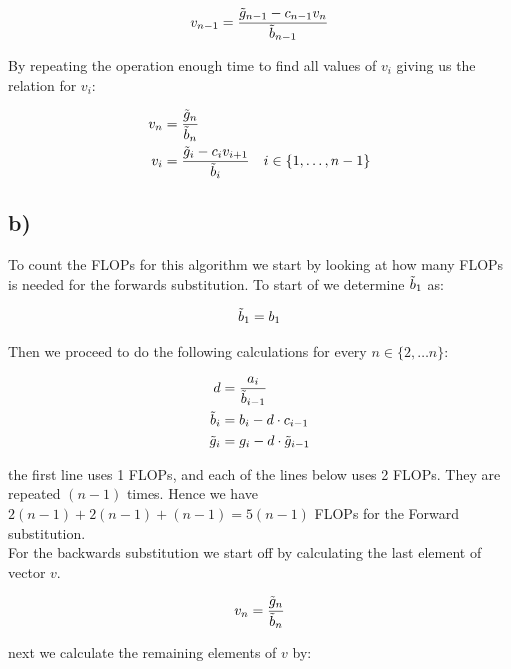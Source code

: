 \documentclass[a4paper,10pt,english]{article}
\begin{document}
			\begin{equation*}
				v_{n-1} = \frac{\Tilde{g}_{n-1}-c_{n-1}v_n}{\Tilde{b}_{n-1}}
			\end{equation*}
			
			By repeating the operation enough time to find all values of $v_i$ giving us the
			relation for $v_i$:
			
			\begin{align*}
				v_n &= \frac{\Tilde{g}_n}{\Tilde{b}_n} \\
				v_i &= \frac{\Tilde{g}_i - c_i v_{i+1}}{\Tilde{b}_i} \quad i \in \{1, \dots, n-1\} 
			\end{align*}
			
			
			\subsection{b)}
			To count the FLOPs for this algorithm we start by looking at how many FLOPs is
			needed for the forwards substitution.
			To start of we determine $\Tilde{b}_1$ as:
			
			\begin{equation}
				\Tilde{b}_1 = b_1
				\label{eq_gen_algo_I}
			\end{equation}
			
			Then we proceed to do the following calculations for every $n \in \{2,\dots n\}$:
			
			\begin{align}
				d &= \frac{a_i}{\Tilde{b}_{i-1}} \\
				\Tilde{b}_i &= b_i - d \cdot c_{i-1}
				\label{eq_gen_algo_II} \\
				\Tilde{g}_i &= g_i - d \cdot \Tilde{g}_{i-1}
				\label{eq_gen_algo_III}
			\end{align}
			
			the first line uses 1 FLOPs, and each of the lines below uses 2 FLOPs. They are repeated 
			$(n-1)$ times.  Hence we have $2(n-1) + 2(n-1) + (n - 1) = 5(n-1)$ FLOPs for the Forward substitution.
			\\
			
			For the backwards substitution we start off by calculating the last element of vector $v$.
			
			\begin{equation}
				v_n = \frac{\Tilde{g}_n}{\Tilde{b}_n}
				\label{eq_gen_algo_IV}
			\end{equation}
			
			next we calculate the remaining elements of $v$ by:
			
\end{document}
